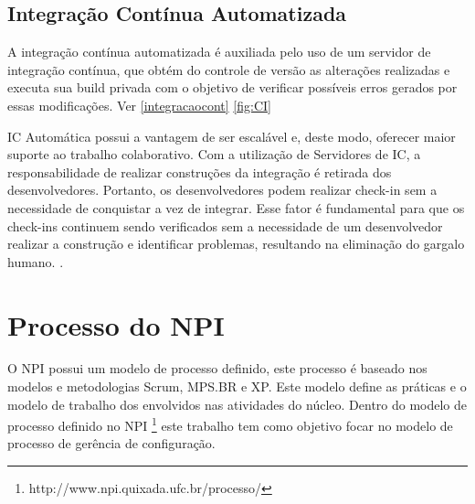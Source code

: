 \subsection{Integração Contínua Automatizada}
A integração contínua automatizada é auxiliada pelo uso de um servidor de integração contínua, que obtém do controle de versão as alterações realizadas e executa sua build privada com o objetivo de verificar possíveis erros gerados por essas modificações. Ver \autoref{integracaocont} \autoref{fig:CI} 
\begin{citacao}
IC Automática possui a vantagem de ser escalável 
e,  deste  modo,  oferecer  maior  suporte  ao  trabalho  colaborativo.  Com  a  utilização  de 
Servidores  de  IC,  a  responsabilidade  de  realizar  construções  da  integração  é  retirada  dos desenvolvedores. Portanto, os desenvolvedores podem realizar  check-in  sem a necessidade de 
conquistar a vez de integrar. Esse fator é fundamental para que os  check-ins  continuem sendo 
verificados  sem  a  necessidade  de  um desenvolvedor  realizar  a  construção  e identificar 
problemas, resultando na eliminação do gargalo humano. . 
\end{citacao}

\section{Processo do NPI}
O NPI possui um modelo de processo definido, este processo é baseado nos modelos e metodologias Scrum, MPS.BR e XP. Este modelo define as práticas e o modelo de trabalho dos envolvidos nas atividades do núcleo. Dentro do modelo de processo definido no NPI \footnote{http://www.npi.quixada.ufc.br/processo/} este trabalho tem como objetivo focar no modelo de processo de gerência de configuração.


